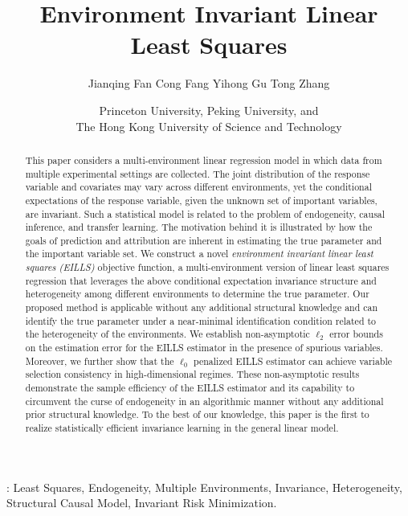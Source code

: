 \documentclass[10pt]{article}
\numberwithin{equation}{section}
\begin{document}
\setcounter{tocdepth}{2}

\title{Environment Invariant Linear Least Squares}
\author{ 
	Jianqing Fan
	\qquad Cong Fang
	\qquad Yihong Gu
	\qquad Tong Zhang}
\date{Princeton University, Peking University, and \\ The Hong Kong University of Science and Technology}
\maketitle

\begin{abstract}
    This paper considers a multi-environment linear regression model in which data from multiple experimental settings are collected. The joint distribution of the response variable and covariates may vary across different environments, yet the conditional expectations of the response variable, given the unknown set of important variables, are invariant. Such a statistical model is related to the problem of endogeneity, causal inference, and transfer learning. The motivation behind it is illustrated by how the goals of prediction and attribution are inherent in estimating the true parameter and the important variable set. We construct a novel {\it environment invariant linear least squares (EILLS)} objective function, a multi-environment version of linear least squares regression that leverages the above conditional expectation invariance structure and heterogeneity among different environments to determine the true parameter. Our proposed method is applicable without any additional structural knowledge and can identify the true parameter under a near-minimal identification condition related to the heterogeneity of the environments. We establish non-asymptotic $\ell_2$ error bounds on the estimation error for the EILLS estimator in the presence of spurious variables. Moreover, we further show that the $\ell_0$ penalized EILLS estimator can achieve variable selection consistency in high-dimensional regimes. These non-asymptotic results demonstrate the sample efficiency of the EILLS estimator and its capability to circumvent the curse of endogeneity in an algorithmic manner without any additional prior structural knowledge.  To the best of our knowledge, this paper is the first to realize statistically efficient invariance learning in the general linear model.
\end{abstract} 
: Least Squares, Endogeneity, Multiple Environments, Invariance, Heterogeneity, Structural Causal Model, Invariant Risk Minimization.
\end{document}
